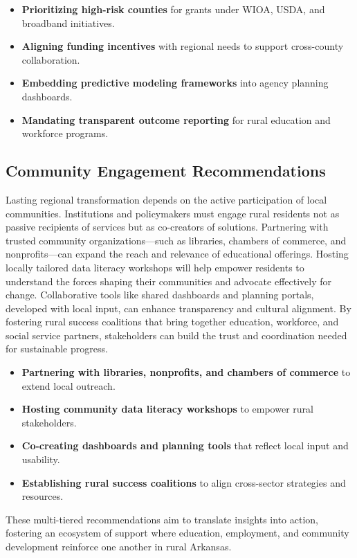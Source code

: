 \documentclass{llncs}
\begin{document}
\begin{itemize}
    \item \textbf{Prioritizing high-risk counties} for grants under WIOA, USDA, and broadband initiatives.
    \item \textbf{Aligning funding incentives} with regional needs to support cross-county collaboration.
    \item \textbf{Embedding predictive modeling frameworks} into agency planning dashboards.
    \item \textbf{Mandating transparent outcome reporting} for rural education and workforce programs.
\end{itemize}

\subsection{Community Engagement Recommendations} \label{subsec:community_engagement}

Lasting regional transformation depends on the active participation of local communities. Institutions and policymakers must engage rural residents not as passive recipients of services but as co-creators of solutions. Partnering with trusted community organizations—such as libraries, chambers of commerce, and nonprofits—can expand the reach and relevance of educational offerings. Hosting locally tailored data literacy workshops will help empower residents to understand the forces shaping their communities and advocate effectively for change. Collaborative tools like shared dashboards and planning portals, developed with local input, can enhance transparency and cultural alignment. By fostering rural success coalitions that bring together education, workforce, and social service partners, stakeholders can build the trust and coordination needed for sustainable progress.

\begin{itemize}
    \item \textbf{Partnering with libraries, nonprofits, and chambers of commerce} to extend local outreach.
    \item \textbf{Hosting community data literacy workshops} to empower rural stakeholders.
    \item \textbf{Co-creating dashboards and planning tools} that reflect local input and usability.
    \item \textbf{Establishing rural success coalitions} to align cross-sector strategies and resources.
\end{itemize}

These multi-tiered recommendations aim to translate insights into action, fostering an ecosystem of support where education, employment, and community development reinforce one another in rural Arkansas.

\clearpage
{}
{}


\clearpage
     
\end{document}

